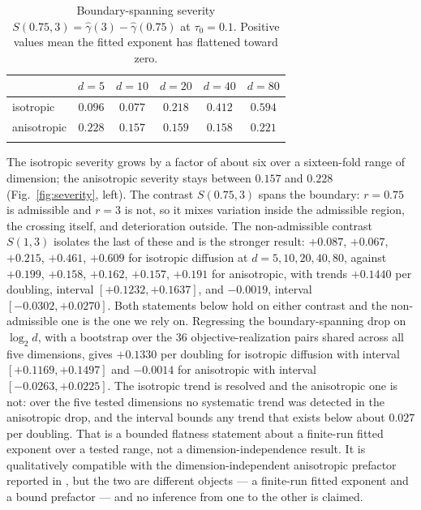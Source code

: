 \documentclass[pdflatex,sn-mathphys-num]{sn-jnl}
\theoremstyle{thmstyleone}
\theoremstyle{thmstyletwo}
\theoremstyle{thmstylethree}
\begin{document}
\begin{table}[h]
\caption{Boundary-spanning severity $S(0.75,3)=\hat\gamma(3)-\hat\gamma(0.75)$ at $\tau_0=0.1$. Positive values mean the fitted exponent has flattened toward zero.}\label{tab:severity}
\begin{tabular}{@{}lccccc@{}}
\toprule
& $d=5$ & $d=10$ & $d=20$ & $d=40$ & $d=80$\\
\midrule
isotropic & $0.096$ & $0.077$ & $0.218$ & $0.412$ & $0.594$\\
anisotropic & $0.228$ & $0.157$ & $0.159$ & $0.158$ & $0.221$\\
\botrule
\end{tabular}
\end{table}

The isotropic severity grows by a factor of about six over a sixteen-fold range of dimension; the anisotropic severity stays between $0.157$ and $0.228$ (Fig.~\ref{fig:severity}, left). The contrast $S(0.75,3)$ spans the boundary: $r=0.75$ is admissible and $r=3$ is not, so it mixes variation inside the admissible region, the crossing itself, and deterioration outside. The non-admissible contrast $S(1,3)$ isolates the last of these and is the stronger result: $+0.087$, $+0.067$, $+0.215$, $+0.461$, $+0.609$ for isotropic diffusion at $d=5,10,20,40,80$, against $+0.199$, $+0.158$, $+0.162$, $+0.157$, $+0.191$ for anisotropic, with trends $+0.1440$ per doubling, interval $[+0.1232,+0.1637]$, and $-0.0019$, interval $[-0.0302,+0.0270]$. Both statements below hold on either contrast and the non-admissible one is the one we rely on. Regressing the boundary-spanning drop on $\log_2 d$, with a bootstrap over the $36$ objective-realization pairs shared across all five dimensions, gives $+0.1330$ per doubling for isotropic diffusion with interval $[+0.1169,+0.1497]$ and $-0.0014$ for anisotropic with interval $[-0.0263,+0.0225]$. The isotropic trend is resolved and the anisotropic one is not: over the five tested dimensions no systematic trend was detected in the anisotropic drop, and the interval bounds any trend that exists below about $0.027$ per doubling. That is a bounded flatness statement about a finite-run fitted exponent over a tested range, not a dimension-independence result. It is qualitatively compatible with the dimension-independent anisotropic prefactor reported in \cite{ghkv2025}, but the two are different objects --- a finite-run fitted exponent and a bound prefactor --- and no inference from one to the other is claimed.
\end{document}
